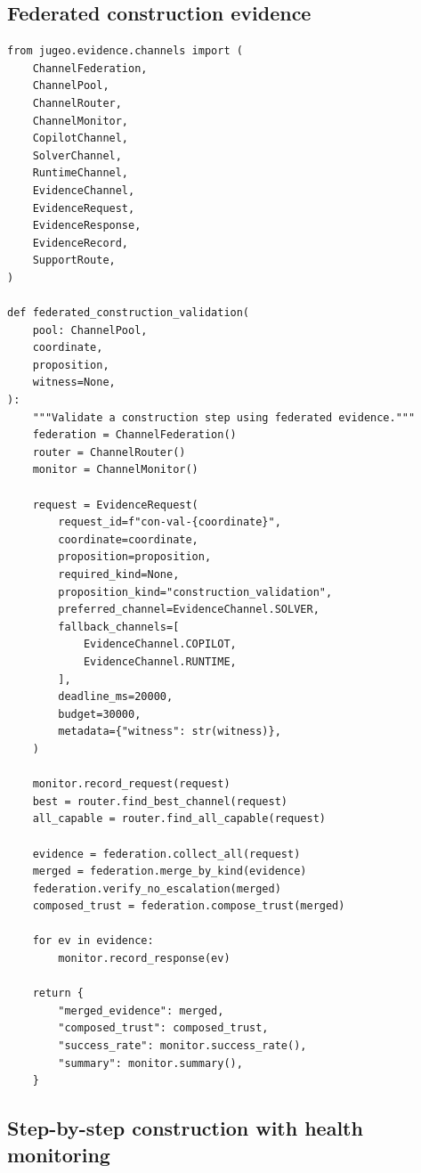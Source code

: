 \documentclass[11pt]{article}
\begin{document}
\subsection{Federated construction evidence}

\begin{lstlisting}[style=jugeo-python,
  caption={Federated evidence for construction validation},
  label={lst:confed}]
from jugeo.evidence.channels import (
    ChannelFederation,
    ChannelPool,
    ChannelRouter,
    ChannelMonitor,
    CopilotChannel,
    SolverChannel,
    RuntimeChannel,
    EvidenceChannel,
    EvidenceRequest,
    EvidenceResponse,
    EvidenceRecord,
    SupportRoute,
)

def federated_construction_validation(
    pool: ChannelPool,
    coordinate,
    proposition,
    witness=None,
):
    """Validate a construction step using federated evidence."""
    federation = ChannelFederation()
    router = ChannelRouter()
    monitor = ChannelMonitor()

    request = EvidenceRequest(
        request_id=f"con-val-{coordinate}",
        coordinate=coordinate,
        proposition=proposition,
        required_kind=None,
        proposition_kind="construction_validation",
        preferred_channel=EvidenceChannel.SOLVER,
        fallback_channels=[
            EvidenceChannel.COPILOT,
            EvidenceChannel.RUNTIME,
        ],
        deadline_ms=20000,
        budget=30000,
        metadata={"witness": str(witness)},
    )

    monitor.record_request(request)
    best = router.find_best_channel(request)
    all_capable = router.find_all_capable(request)

    evidence = federation.collect_all(request)
    merged = federation.merge_by_kind(evidence)
    federation.verify_no_escalation(merged)
    composed_trust = federation.compose_trust(merged)

    for ev in evidence:
        monitor.record_response(ev)

    return {
        "merged_evidence": merged,
        "composed_trust": composed_trust,
        "success_rate": monitor.success_rate(),
        "summary": monitor.summary(),
    }
\end{lstlisting}

\subsection{Step-by-step construction with health monitoring}
\end{document}
